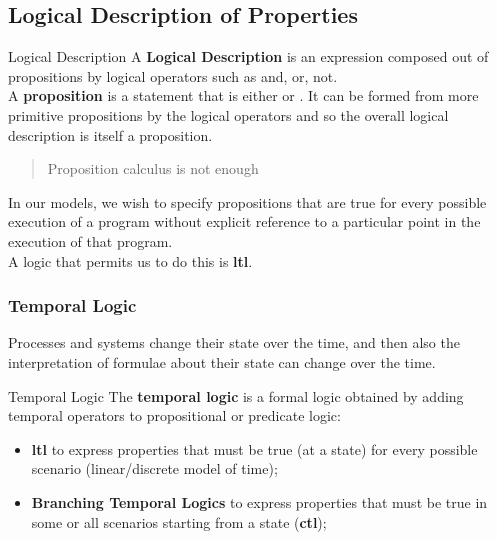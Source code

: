 \subsection{Logical Description of Properties}\label{sub:an_logival_description_of_properties} %
\begin{definition}{Logical Description}{}
    A \textbf{Logical Description} is an expression composed out of propositions by logical operators such as and, or, not.
    \\
    A \textbf{proposition} is a statement that is either  or .
    It can be formed from more primitive propositions by the logical operators and so the overall logical description is itself a proposition.
\end{definition}
\begin{quote}
    Proposition calculus is not enough
\end{quote}
In our models, we wish to specify propositions that are true for every possible execution of a program without explicit reference to a particular point in the execution of that program.
\\
A logic that permits us to do this is \textbf{\ac{ltl}}.
%
\subsubsection{Temporal Logic}\label{sub:an_temporal_logic} %
Processes and systems change their state over the time, and then also the interpretation of formulae about their state can change over the time.
\begin{definition}{Temporal Logic}{}
    The \textbf{temporal logic} is a formal logic obtained by adding temporal operators to propositional or predicate logic:
    \begin{itemize}
        \item \textbf{\acf{ltl}} to express properties that must be true (at a state) for every possible scenario (linear/discrete model of time);
        \item \textbf{Branching Temporal Logics} to express properties that must be true in some or all scenarios starting from a state (\textbf{\ac{ctl}});
    \end{itemize}
\end{definition}
%
